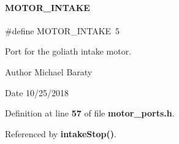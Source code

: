 \mbox{\label{motor__ports_8h_a8478b6a82af1c8159ef255956ef2561b}} 
\paragraph{M\+O\+T\+O\+R\+\_\+\+I\+N\+T\+A\+KE}
{\footnotesize\ttfamily \#define M\+O\+T\+O\+R\+\_\+\+I\+N\+T\+A\+KE~5}



Port for the goliath intake motor. 

\begin{DoxyAuthor}{Author}
Michael Baraty 
\end{DoxyAuthor}
\begin{DoxyDate}{Date}
10/25/2018 
\end{DoxyDate}


Definition at line \textbf{ 57} of file \textbf{ motor\+\_\+ports.\+h}.



Referenced by \textbf{ intake\+Stop()}.

